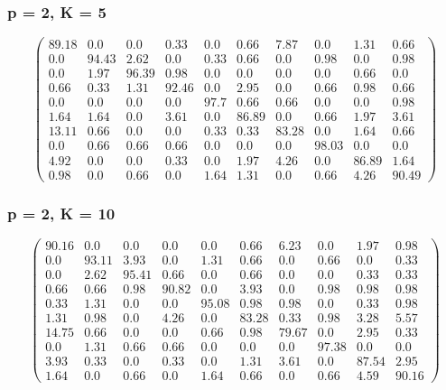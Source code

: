 \begin{appendices}
\subsubsection*{p = 2, K = 5}
$$\begin{pmatrix}
89.18&0.0&0.0&0.33&0.0&0.66&7.87&0.0&1.31&0.66\\
0.0&94.43&2.62&0.0&0.33&0.66&0.0&0.98&0.0&0.98\\
0.0&1.97&96.39&0.98&0.0&0.0&0.0&0.0&0.66&0.0\\
0.66&0.33&1.31&92.46&0.0&2.95&0.0&0.66&0.98&0.66\\
0.0&0.0&0.0&0.0&97.7&0.66&0.66&0.0&0.0&0.98\\
1.64&1.64&0.0&3.61&0.0&86.89&0.0&0.66&1.97&3.61\\
13.11&0.66&0.0&0.0&0.33&0.33&83.28&0.0&1.64&0.66\\
0.0&0.66&0.66&0.66&0.0&0.0&0.0&98.03&0.0&0.0\\
4.92&0.0&0.0&0.33&0.0&1.97&4.26&0.0&86.89&1.64\\
0.98&0.0&0.66&0.0&1.64&1.31&0.0&0.66&4.26&90.49
\end{pmatrix}$$

\subsubsection*{p = 2, K = 10}
$$\begin{pmatrix}
90.16&0.0&0.0&0.0&0.0&0.66&6.23&0.0&1.97&0.98\\
0.0&93.11&3.93&0.0&1.31&0.66&0.0&0.66&0.0&0.33\\
0.0&2.62&95.41&0.66&0.0&0.66&0.0&0.0&0.33&0.33\\
0.66&0.66&0.98&90.82&0.0&3.93&0.0&0.98&0.98&0.98\\
0.33&1.31&0.0&0.0&95.08&0.98&0.98&0.0&0.33&0.98\\
1.31&0.98&0.0&4.26&0.0&83.28&0.33&0.98&3.28&5.57\\
14.75&0.66&0.0&0.0&0.66&0.98&79.67&0.0&2.95&0.33\\
0.0&1.31&0.66&0.66&0.0&0.0&0.0&97.38&0.0&0.0\\
3.93&0.33&0.0&0.33&0.0&1.31&3.61&0.0&87.54&2.95\\
1.64&0.0&0.66&0.0&1.64&0.66&0.0&0.66&4.59&90.16
\end{pmatrix}$$


\end{appendices}
